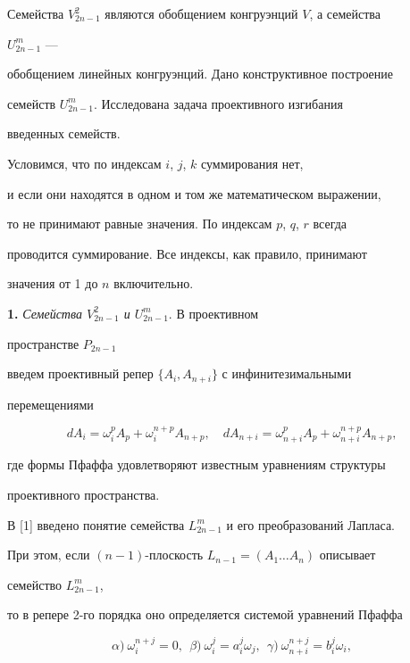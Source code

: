 Семейства $V^2_{2n-1}$ являются обобщением конгруэнций $V$, а семейства 


$U^m_{2n-1}$ --- 


обобщением линейных конгруэнций. Дано конструктивное построение 


семейств $U^m_{2n-1}$. Исследована задача проективного изгибания 


введенных семейств. 


 


Условимся, что по индексам $i$, $j$, $k$ суммирования нет, 


и если они находятся в одном и том же математическом выражении, 


то не принимают равные значения. По индексам $p$, $q$, $r$ всегда 


проводится суммирование. Все индексы, как правило, принимают 


значения от 1 до $n$ включительно. 


\medskip 


 


{\bf 1.} {\it Семейства $V^2_{2n-1}$ и $U^m_{2n-1}$}. В проективном 


пространстве $P_{2n-1}$ 


введем проективный репер $\{A_i,A_{n+i}\}$ с инфинитезимальными 


перемещениями 


$$ 


d A_i=\omega^p_i A_p+\omega^{n+p}_i A_{n+p},\quad 


d A_{n+i}=\omega^p_{n+i}A_p+\omega^{n+p}_{n+i}A_{n+p}, 


$$ 


где формы Пфаффа удовлетворяют известным уравнениям структуры 


проективного пространства. 


 


В [1] введено понятие семейства $L^m_{2n-1}$ и его преобразований Лапласа. 


При этом, если $(n-1)$-плоскость $L_{n-1}=(A_1\dotsc A_n)$ описывает 


семейство $L^m_{2n-1}$, 


то в репере 2-го порядка оно определяется системой уравнений Пфаффа 


\begin{equation} 


\alpha)\ \omega^{n+j}_i=0,\ \ \beta)\ \omega^j_i=a^j_i\omega_j, 


\ \ \gamma)\ \omega^{n+j}_{n+i}=b^j_i\omega_i, 


\end{equation} 


